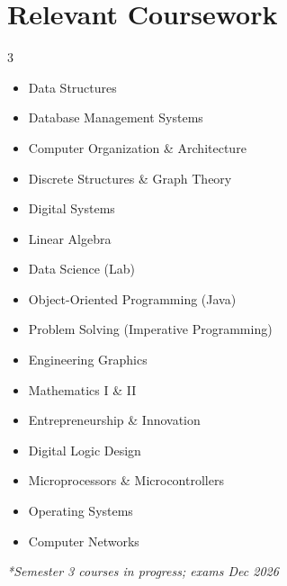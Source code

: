 \documentclass[letterpaper,11pt]{article}
\begin{document}
\section{Relevant Coursework}
    \begin{multicols}{3}
        \begin{itemize}[itemsep=2pt, parsep=1pt]
            \item\small Data Structures
            \item Database Management Systems
            \item Computer Organization \& Architecture
            \item Discrete Structures \& Graph Theory
            \item Digital Systems
            \item Linear Algebra
            \item Data Science (Lab)
            \item Object-Oriented Programming (Java)
            \item Problem Solving (Imperative Programming)
            \item Engineering Graphics
            \item Mathematics I \& II
            \item Entrepreneurship \& Innovation
            \item Digital Logic Design
            \item Microprocessors \& Microcontrollers
            \item Operating Systems
            \item Computer Networks
        \end{itemize}
    \end{multicols}
    \small \textit{*Semester 3 courses in progress; exams Dec 2026}
  \vspace{4pt}
\end{document}
